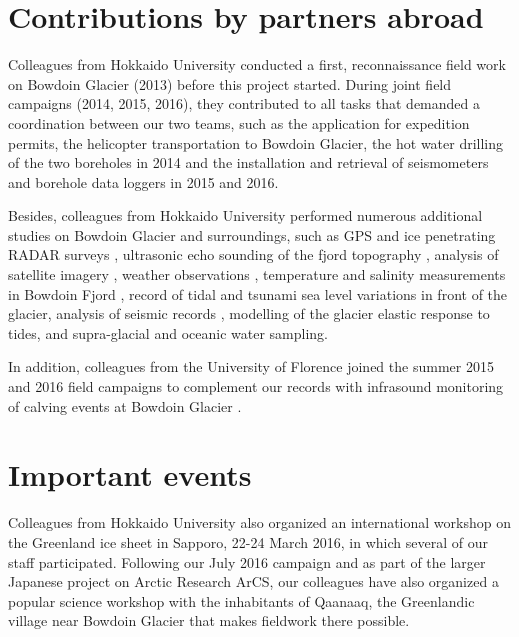 \documentclass{article}
\begin{document}
\section{Contributions by partners abroad}

Colleagues from Hokkaido University conducted a first, reconnaissance field
work on Bowdoin Glacier (2013) before this project started. During joint field
campaigns (2014, 2015, 2016), they contributed to all tasks that demanded a
coordination between our two teams, such as the application for expedition
permits, the helicopter transportation to Bowdoin Glacier, the hot water
drilling of the two boreholes in 2014 and the installation and retrieval of
seismometers and borehole data loggers in 2015 and 2016.

Besides, colleagues from Hokkaido University performed numerous additional
studies on Bowdoin Glacier and surroundings, such as GPS and ice penetrating
RADAR surveys \citep{Sugiyama.etal.2015, Tsutaki.etal.2016}, ultrasonic echo
sounding of the fjord topography \citep{Sugiyama.etal.2015}, analysis of
satellite imagery \citep{Sugiyama.etal.2015, Tsutaki.etal.2016,
Sugiyama.etal.2017}, weather observations \citep{Sugiyama.etal.2015},
temperature and salinity measurements in Bowdoin Fjord
\citep{Sugiyama.etal.2017}, record of tidal and tsunami sea level variations in
front of the glacier, analysis of seismic records \citep{Podolskiy.etal.2016,
Podolskiy.etal.2017}, modelling of the glacier elastic response to tides, and
supra-glacial and oceanic water sampling.

In addition, colleagues from the University of Florence joined the summer 2015
and 2016 field campaigns to complement our records with infrasound monitoring
of calving events at Bowdoin Glacier \citep{Podolskiy.etal.2017}.


\section{Important events}

Colleagues from Hokkaido University also organized an international workshop
on the Greenland ice sheet in Sapporo, 22-24 March 2016, in which several of
our staff participated. Following our July 2016 campaign and as part of the
larger Japanese project on Arctic Research ArCS, our colleagues have also
organized a popular science workshop with the inhabitants of Qaanaaq, the
Greenlandic village near Bowdoin Glacier that makes fieldwork there possible.






\end{document}

